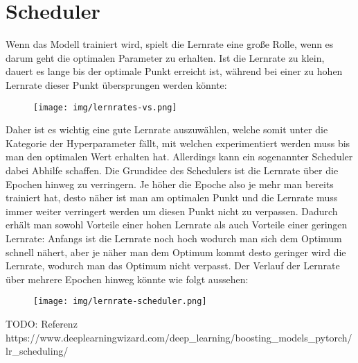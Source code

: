 \documentclass[11pt, a4paper]{article}
\begin{document}
\section{Scheduler}
Wenn das Modell trainiert wird, spielt die Lernrate eine große Rolle, wenn es darum geht die optimalen Parameter zu erhalten. Ist die Lernrate zu klein, dauert es lange bis der optimale Punkt erreicht ist, während bei einer zu hohen Lernrate dieser Punkt übersprungen werden könnte:
\begin{figure}[h]
\centering
\texttt{[image: img/lernrates-vs.png]}
\end{figure}
Daher ist es wichtig eine gute Lernrate auszuwählen, welche somit unter die Kategorie der Hyperparameter fällt, mit welchen experimentiert werden muss bis man den optimalen Wert erhalten hat. Allerdings kann ein sogenannter Scheduler dabei Abhilfe schaffen. Die Grundidee des Schedulers ist die Lernrate über die Epochen hinweg zu verringern. Je höher die Epoche also je mehr man bereits trainiert hat, desto näher ist man am optimalen Punkt und die Lernrate muss immer weiter verringert werden um diesen Punkt nicht zu verpassen. Dadurch erhält man sowohl Vorteile einer hohen Lernrate als auch Vorteile einer geringen Lernrate: Anfangs ist die Lernrate noch hoch wodurch man sich dem Optimum schnell nähert, aber je näher man dem Optimum kommt desto geringer wird die Lernrate, wodurch man das Optimum nicht verpasst. Der Verlauf der Lernrate über mehrere Epochen hinweg könnte wie folgt aussehen:
\begin{figure}[h]
\centering
\texttt{[image: img/lernrate-scheduler.png]}
\end{figure}

TODO: Referenz https://www.deeplearningwizard.com/deep_learning/boosting_models_pytorch/lr_scheduling/
\end{document}
